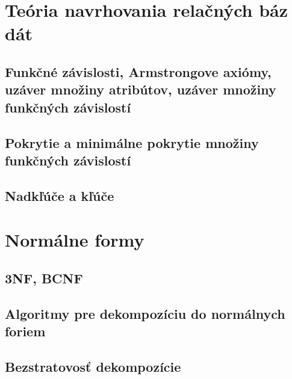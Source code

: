 \documentclass[10pt,a4paper]{article}
\begin{document}
\section{Teória navrhovania relačných báz dát}

\subsection{Funkčné závislosti, Armstrongove axiómy, uzáver množiny atribútov, uzáver množiny funkčných závislostí}

\subsection{Pokrytie a minimálne pokrytie množiny funkčných závislostí}

\subsection{Nadkľúče a kľúče}
    
\section{Normálne formy}

\subsection{3NF, BCNF}

\subsection{Algoritmy pre dekompozíciu do normálnych foriem}

\subsection{Bezstratovosť dekompozície}
    
\end{document}

